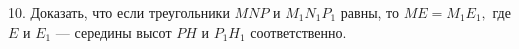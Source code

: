 10. Доказать, что если треугольники $MNP$ и $M_1N_1P_1$ равны, то $ME=M_1E_1,$ где $E$ и $E_1$ --- середины высот $PH$ и $P_1H_1$ соответственно.\\
